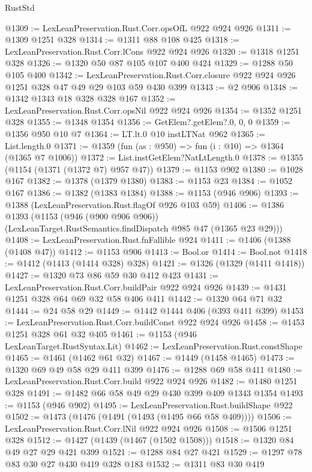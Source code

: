 \begin{lexlean}{RustStd}
\begin{coremodule}
{\begin{coremodule}
{{{{{{{{{{@1309 := LexLeanPreservation.Rust.Corr.opsOfL @922 @924 @926
@1311 := @1309 @1251 @328
@1314 := @1311 @88 @108 @425
@1318 := LexLeanPreservation.Rust.Corr.lCons @922 @924 @926
@1320 := @1318 @1251 @328
@1326 := @1320 @50 @87 @105 @107 @400 @424
@1329 := @1288 @50 @105 @400
@1342 := LexLeanPreservation.Rust.Corr.closure
    @922
    @924
    @926
    @1251
    @328
    @47
    @49
    @29
    @103
    @59
    @430
    @399
@1343 := @2 @906
@1348 := @1342 @1343 @18 @328 @328 @167
@1352 := LexLeanPreservation.Rust.Corr.opsNil @922 @924 @926
@1354 := @1352 @1251 @328
@1355 := @1348 @1354
@1356 := GetElem?.getElem?.{0, 0, 0}
@1359 := @1356 @950 @10 @7
@1364 := LT.lt.{0} @10 instLTNat @962
@1365 := List.length.{0}
@1371 := @1359 (fun (as : @950) => fun (i : @10) => @1364 (@1365 @7 @1006))
@1372 := List.instGetElem?NatLtLength.{0}
@1378 := @1355 (@1154 (@1371 (@1372 @7) @957 @47))
@1379 := @1153 @902
@1380 := @1028 @167
@1382 := @1378 (@1379 @1380)
@1383 := @1153 @23
@1384 := @1052 @167
@1386 := @1382 (@1383 @1384)
@1388 := @1153 (@946 @906)
@1393 := @1388 (LexLeanPreservation.Rust.flagOf @926 @103 @59)
@1406 := @1386
    @1393
    (@1153
      (@946 (@900 @906 @906))
      (LexLeanTarget.RustSemantics.findDispatch @985 @47 (@1365 @23 @29)))
@1408 := LexLeanPreservation.Rust.fnFallible @924
@1411 := @1406 (@1388 (@1408 @47))
@1412 := @1153 @906
@1413 := Bool.or
@1414 := Bool.not
@1418 := @1412 (@1413 (@1414 @328) @328)
@1421 := @1326 (@1329 (@1411 @1418))
@1427 := @1320 @73 @86 @59 @30 @412 @423
@1431 := LexLeanPreservation.Rust.Corr.buildPair @922 @924 @926
@1439 := @1431 @1251 @328 @64 @69 @32 @58 @406 @411
@1442 := @1320 @64 @71 @32
@1444 := @24 @58 @29
@1449 := @1442 @1444 @406 (@393 @411 @399)
@1453 := LexLeanPreservation.Rust.Corr.buildConst @922 @924 @926
@1458 := @1453 @1251 @328 @61 @32 @405
@1461 := @1153 (@946 LexLeanTarget.RustSyntax.Lit)
@1462 := LexLeanPreservation.Rust.constShape
@1465 := @1461 (@1462 @61 @32)
@1467 := @1449 (@1458 @1465)
@1473 := @1320 @69 @49 @58 @29 @411 @399
@1476 := @1288 @69 @58 @411
@1480 := LexLeanPreservation.Rust.Corr.build @922 @924 @926
@1482 := @1480 @1251 @328
@1491 := @1482 @66 @58 @49 @29 @430 @399 @409 @1343 @1354
@1493 := @1153 (@946 @902)
@1495 := LexLeanPreservation.Rust.buildShape @922
@1502 := @1473 (@1476 (@1491 (@1493 (@1495 @66 @58 @409))))
@1506 := LexLeanPreservation.Rust.Corr.lNil @922 @924 @926
@1508 := @1506 @1251 @328
@1512 := @1427 (@1439 (@1467 (@1502 @1508)))
@1518 := @1320 @84 @49 @27 @29 @421 @399
@1521 := @1288 @84 @27 @421
@1529 := @1297 @78 @83 @30 @27 @430 @419 @328 @183
@1532 := @1311 @83 @30 @419
}}}}}}}}}}
\end{coremodule}}
\end{coremodule}
\end{lexlean}

